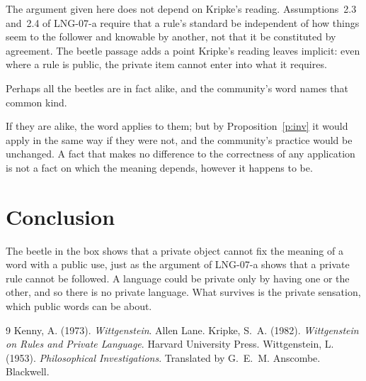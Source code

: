 \documentclass{situationist-preprint}
\begin{document}
\begin{reply}
The argument given here does not depend on Kripke's reading. Assumptions~2.3 and~2.4 of LNG-07-a require that a rule's standard be independent of how things seem to the follower and knowable by another, not that it be constituted by agreement. The beetle passage adds a point Kripke's reading leaves implicit: even where a rule is public, the private item cannot enter into what it requires.
\end{reply}

\begin{objection}
Perhaps all the beetles are in fact alike, and the community's word names that common kind.
\end{objection}

\begin{reply}
If they are alike, the word applies to them; but by Proposition~\ref{p:inv} it would apply in the same way if they were not, and the community's practice would be unchanged. A fact that makes no difference to the correctness of any application is not a fact on which the meaning depends, however it happens to be.
\end{reply}

\section{Conclusion}

The beetle in the box shows that a private object cannot fix the meaning of a word with a public use, just as the argument of LNG-07-a shows that a private rule cannot be followed. A language could be private only by having one or the other, and so there is no private language. What survives is the private sensation, which public words can be about.

\begin{thebibliography}{9}\small
{} Kenny, A. (1973). \emph{Wittgenstein}. Allen Lane.
 Kripke, S.~A. (1982). \emph{Wittgenstein on Rules and Private Language}. Harvard University Press.
 Wittgenstein, L. (1953). \emph{Philosophical Investigations}. Translated by G.~E.~M. Anscombe. Blackwell.
\end{thebibliography}
\end{document}
